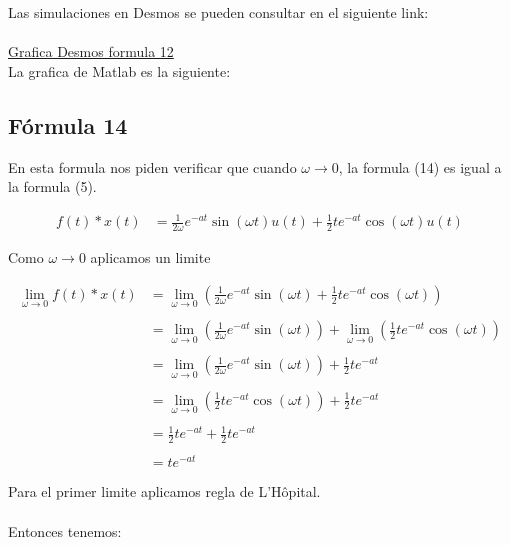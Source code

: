\documentclass[10pt]{article}
\begin{document}
Las simulaciones en Desmos se pueden consultar en el siguiente link:\\\\
\href{https://www.desmos.com/calculator/jlupnjrano}{Grafica Desmos formula 12} \\

\newpage
La grafica de Matlab es la siguiente:

\clearpage
\newpage
\subsection{Fórmula 14}
En esta formula nos piden verificar que cuando ${ \omega \to 0}$, la formula (14) es igual a la formula (5).

\begin{equation*} 
\begin{split}
f(t)*x(t) & = \frac{1}{2 \omega}e^{-at}\sin(\omega t)u(t) + \frac{1}{2}te^{-at}\cos(\omega t)u(t)
\end{split}
\end{equation*}

Como ${ \omega \to 0}$ aplicamos un limite

\begin{equation*} 
\begin{split}
\lim_{\omega\to 0} f(t)*x(t) & = \lim_{\omega\to 0} \left(\frac{1}{2 \omega}e^{-at}\sin(\omega t) + \frac{1}{2}te^{-at}\cos(\omega t)\right)\\ \\
& = \lim_{\omega\to 0} \left(\frac{1}{2 \omega}e^{-at}\sin(\omega t)\right) + \lim_{\omega\to 0} \left(\frac{1}{2}te^{-at}\cos(\omega t)\right)\\ \\
& = \lim_{\omega\to 0} \left(\frac{1}{2 \omega}e^{-at}\sin(\omega t)\right) + \frac{1}{2}te^{-at}\\ \\
& = \lim_{\omega\to 0} \left(\frac{1}{2}te^{-at}\cos(\omega t)\right) + \frac{1}{2}te^{-at}\\ \\
& = \frac{1}{2}te^{-at} + \frac{1}{2}te^{-at}\\ \\
& = te^{-at}\\ \\
\end{split}
\end{equation*}
Para el primer limite aplicamos regla de L'Hôpital.\\ \\
Entonces tenemos:
\end{document}
